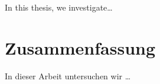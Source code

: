 In this thesis, we investigate…

\bigskip


\pagebreak


\chapter*{Zusammenfassung}
In dieser Arbeit untersuchen wir …

\vfill
